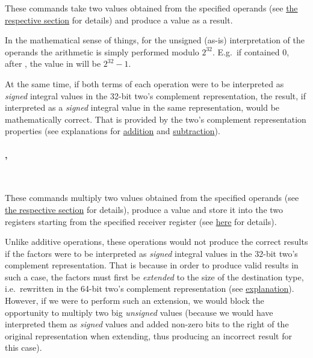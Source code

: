 These commands take two  values obtained from the specified operands
(see \hyperlink{types:twos_complement}{the respective section} for details)
and produce a  value as a result.

In the mathematical sense of things, for the unsigned (as-is) interpretation of
the operands the arithmetic is simply performed modulo $2^{32}$.
E.g.\ if  contained 0, after ,
the value in  will be $2^{32}-1$.

At the same time, if both terms of each operation were to be interpreted as
\textit{signed} integral values in the 32-bit two's complement representation,
the result, if interpreted as a \textit{signed} integral value in the same
representation, would be mathematically correct.
That is provided by the two's complement representation properties
(see explanations for
\href{https://en.wikipedia.org/wiki/Two\%27s_complement#Addition}{addition} and
\href{https://en.wikipedia.org/wiki/Two\%27s_complement#Subtraction}
{subtraction}).

\vspace{-0.35cm}
\paragraph{, }\

These commands multiply two  values obtained from the specified
operands (see \hyperlink{types:twos_complement}{the respective section}
for details), produce a  value and store it into the two registers
starting from the specified receiver register
(see \hyperlink{types:two_words_storage}{here} for details).

Unlike additive operations, these operations would not produce the correct
results if the factors were to be interpreted as \textit{signed} integral values
in the 32-bit two's complement representation.
That is because in order to produce valid results in such a case,
the factors must first be \textit{extended} to the size of the destination type,
i.e.\ rewritten in the 64-bit two's complement representation (see
\href{https://en.wikipedia.org/wiki/Two\%27s_complement#Multiplication}
{explanation}).
However, if we were to perform such an extension, we would block the opportunity
to multiply two big \textit{unsigned} values (because we would have interpreted
them as \textit{signed} values and added non-zero bits to the right of
the original representation when extending, thus producing an incorrect result
for this case).

